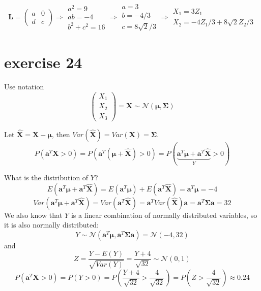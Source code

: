 \documentclass{article}
\let\normalmu\mu
\let\normalSigma\Sigma
\renewcommand{\mu}{\bm{\normalmu}} %
\renewcommand{\Sigma}{\bm{\normalSigma}} %
\begin{document}
\[{\mathbf{L}} = \left( {\begin{array}{*{20}{c}}
            a & 0 \\
            d & c
        \end{array}} \right) \Rightarrow \begin{array}{*{20}{c}}
        {{a^2} = 9} \\
        {ab =  - 4} \\
        {{b^2} + {c^2} = 16}
    \end{array} \Rightarrow \begin{array}{*{20}{c}}
        {a = 3}      \\
        {b =  - 4/3} \\
        {c = 8\sqrt 2 /3}
    \end{array} \Rightarrow \begin{array}{*{20}{c}}
        {{X_1} = 3{Z_1}} \\
        {{X_2} =  - 4{Z_1}/3 + 8\sqrt 2 {Z_2}/3}
    \end{array}
\]

\section{exercise 24}
Use notation
\[\left( {\begin{array}{*{20}{c}}
            {{X_1}} \\
            {{X_2}} \\
            {{X_3}}
        \end{array}} \right) = {\mathbf{X}}\sim\mathcal{N}\left( {{\mathbf{\mu }},{\mathbf{\Sigma }}} \right)\]

Let ${\mathbf{\hat X}} = {\mathbf{X}} - {\mathbf{\mu }}$,
then $Var\left( {{\mathbf{\hat X}}} \right) = Var\left( {\mathbf{X}} \right) = {\mathbf{\Sigma }}$.
\[P\left( {{{\mathbf{a}}^T}{\mathbf{X}} > 0} \right) = P\left( {{{\mathbf{a}}^T}\left( {{\mathbf{\mu }} + {\mathbf{\hat X}}} \right) > 0} \right) = P\left( {\underbrace {{{\mathbf{a}}^T}{\mathbf{\mu }} + {{\mathbf{a}}^T}{\mathbf{\hat X}}}_Y} > 0 \right)\]

What is the distribution of $Y$?
\[E\left( {{{\mathbf{a}}^T}{\mathbf{\mu }} + {{\mathbf{a}}^T}{\mathbf{\hat X}}} \right) = E\left( {{{\mathbf{a}}^T}{\mathbf{\mu }}} \right) + E\left( {{{\mathbf{a}}^T}{\mathbf{\hat X}}} \right) = {{\mathbf{a}}^T}{\mathbf{\mu }} = -4\]
\[Var\left( {{{\mathbf{a}}^T}{\mathbf{\mu }} + {{\mathbf{a}}^T}{\mathbf{\hat X}}} \right) = Var\left( {{{\mathbf{a}}^T}{\mathbf{\hat X}}} \right) = {{\mathbf{a}}^T}Var\left( {{\mathbf{\hat X}}} \right){\mathbf{a}} = {{\mathbf{a}}^T}{\mathbf{\Sigma a}} = 32\]
We also know that $Y$ is a linear combination of normally distributed variables, so it is also normally distributed:
\[Y\sim \mathcal N({{\mathbf{a}}^T}{\mathbf{\mu }}, {{\mathbf{a}}^T}{\mathbf{\Sigma a}}) = \mathcal N(-4, 32)\]
and
\[Z=\frac{Y - E(Y)}{\sqrt{Var(Y)}} = \frac{Y + 4}{\sqrt{32}} \sim \mathcal N(0, 1)\]
\[P\left( {{{\mathbf{a}}^T}{\mathbf{X}} > 0} \right) = P\left( {Y > 0} \right) = P\left( {\frac{{Y + 4}}{{\sqrt {32} }} > \frac{4}{{\sqrt {32} }}} \right) = P\left( {Z > \frac{4}{{\sqrt {32} }}} \right) \approx 0.24\]
\end{document}
